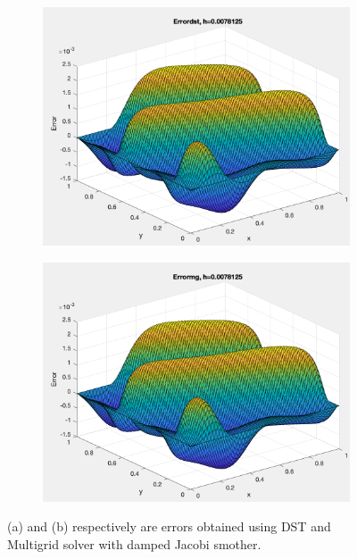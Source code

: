 \documentclass[12pt,a4paper]{article}
\begin{document}
	\begin{figure}[H]
		\begin{subfigure}[b]{0.5\textwidth}
			\centering
			\includegraphics[width=1.0\linewidth]{"edst"}
			\caption{}
			\label{fig:edst}
		\end{subfigure}
		\begin{subfigure}[b]{0.5\textwidth}
			\centering
			\includegraphics[width=1.0\linewidth]{"ej"}
			\caption{}
			\label{fig:ej}
		\end{subfigure}
		\caption{(a) and (b) respectively are errors obtained using DST and Multigrid solver with damped Jacobi smother. }
	\end{figure}
\end{document}
